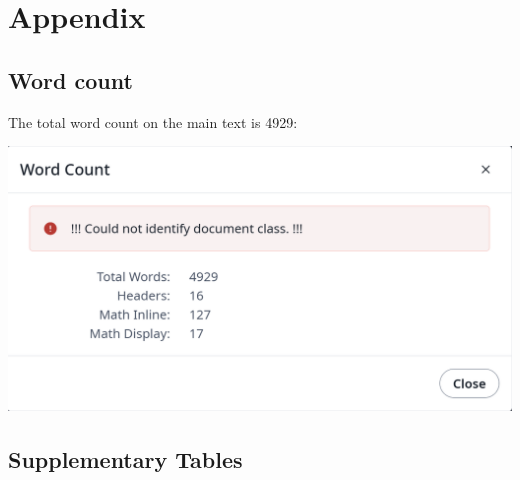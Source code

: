 \documentclass[
  a4paper,
]{scrreprt}
\begin{document}

\chapter*{Appendix}\label{appendix}


\section*{Word count}\label{word-count}


The total word count on the main text is 4929:

\includegraphics[width=0.4\linewidth,height=\textheight,keepaspectratio]{figures/word_count.png}

\section*{Supplementary Tables}\label{supplementary-tables}


\scriptsize
\end{document}
